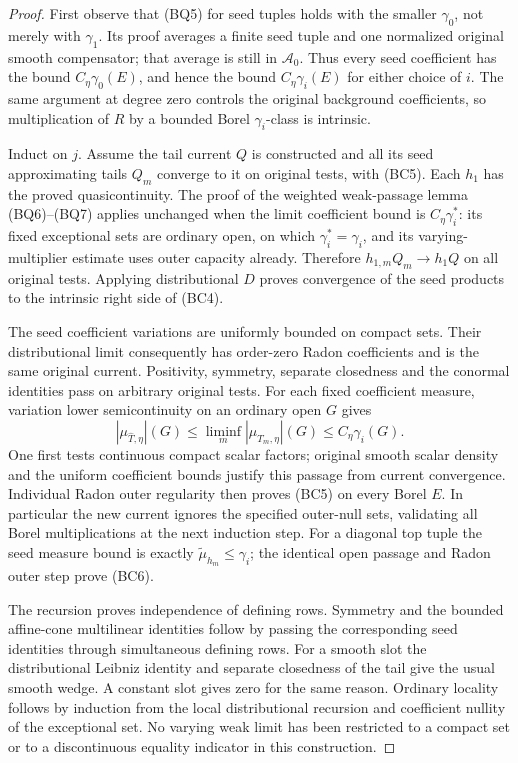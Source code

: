 \begin{proof}
First observe that (BQ5) for seed tuples holds with the smaller
$\gamma_0$, not merely with $\gamma_1$. Its proof averages a
finite seed tuple and one normalized original smooth compensator;
that average is still in $\mathcal A_0$. Thus every seed
coefficient has the bound $C_\eta\gamma_0(E)$, and hence the
bound $C_\eta\gamma_i(E)$ for either choice of $i$.
The same argument at degree zero controls the original background
coefficients, so multiplication of $R$ by a bounded Borel
$\gamma_i$-class is intrinsic.

Induct on $j$. Assume the tail current $Q$ is constructed and
all its seed approximating tails $Q_m$ converge to it on original
tests, with (BC5). Each $h_1$ has the proved quasicontinuity.
The proof of the weighted weak-passage lemma (BQ6)--(BQ7) applies
unchanged when the limit coefficient bound is $C_\eta\gamma_i^*$:
its fixed exceptional sets are ordinary open, on which
$\gamma_i^*=\gamma_i$, and its varying-multiplier estimate uses
outer capacity already. Therefore
$h_{1,m}Q_m\to h_1Q$ on all original tests. Applying
distributional $D$ proves convergence of the seed products to
the intrinsic right side of (BC4).

The seed coefficient variations are uniformly bounded on compact
sets. Their distributional limit consequently has order-zero
Radon coefficients and is the same original current. Positivity,
symmetry, separate closedness and the conormal identities pass
on arbitrary original tests. For each fixed coefficient measure,
variation lower semicontinuity on an ordinary open $G$ gives
\[
        |\mu_{\widehat T,\eta}|(G)
                 \leq\liminf_m|\mu_{T_m,\eta}|(G)
                 \leq C_\eta\gamma_i(G).
 \tag{BC7}
\]
One first tests continuous compact scalar factors; original
smooth scalar density and the uniform coefficient bounds justify
this passage from current convergence. Individual Radon outer
regularity then proves (BC5) on every Borel $E$. In particular
the new current ignores the specified outer-null sets, validating
all Borel multiplications at the next induction step. For a
diagonal top tuple the seed measure bound is exactly
$\widetilde\mu_{h_m}\leq\gamma_i$; the identical open passage
and Radon outer step prove (BC6).

The recursion proves independence of defining rows. Symmetry and
the bounded affine-cone multilinear identities follow by passing
the corresponding seed identities through simultaneous defining
rows. For a smooth slot the distributional Leibniz identity and
separate closedness of the tail give the usual smooth wedge.
A constant slot gives zero for the same reason. Ordinary locality
follows by induction from the local distributional recursion and
coefficient nullity of the exceptional set. No varying weak limit
has been restricted to a compact set or to a discontinuous
equality indicator in this construction.
\end{proof}

